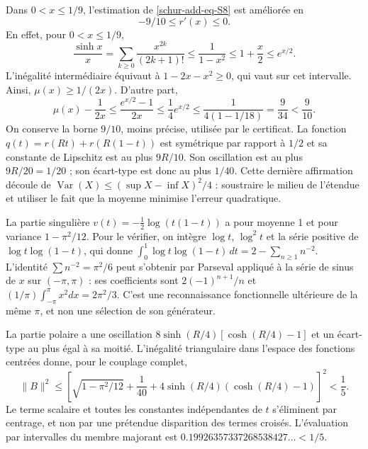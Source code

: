 Dans \(0<x\leq1/9\), l'estimation de \eqref{schur-add-eq-S8} est améliorée en
\begin{equation}
-9/10\leq r'(x)\leq0.
\label{schur-add-display-25}
\end{equation}
En effet, pour \(0<x\leq1/9\),
\begin{equation}
\frac{\sinh x}{x}
=\sum_{k\geq0}\frac{x^{2k}}{(2k+1)!}
\leq\frac1{1-x^2}\leq1+\frac x2\leq e^{x/2}.
\label{schur-add-display-26}
\end{equation}
L'inégalité intermédiaire équivaut à \(1-2x-x^2\geq0\),
qui vaut sur cet intervalle. Ainsi, \(\mu(x)\geq1/(2x)\).
D'autre part,
\begin{equation}
\mu(x)-\frac1{2x}\leq\frac{e^{x/2}-1}{2x}
\leq\frac14 e^{x/2}
\leq\frac1{4(1-1/18)}=\frac9{34}<\frac9{10}.
\label{schur-add-display-27}
\end{equation}
On conserve la borne \(9/10\), moins précise, utilisée par le certificat.
La fonction \(q(t)=r(Rt)+r(R(1-t))\) est symétrique par rapport à
\(1/2\) et sa constante de Lipschitz est au plus \(9R/10\).
Son oscillation est au plus \(9R/20=1/20\) ; son écart-type
est donc au plus \(1/40\). Cette dernière affirmation découle de
\(\operatorname{Var}(X)\leq(\sup X-\inf X)^2/4\) : soustraire le
milieu de l'étendue et utiliser le fait que la moyenne minimise l'erreur quadratique.

La partie singulière \(v(t)=-\tfrac12\log(t(1-t))\) a pour moyenne 1 et pour variance \(1-\pi^2/12\). Pour le vérifier, on intègre \(\log t\), \(\log^2t\) et la série positive de \(\log t\log(1-t)\), qui donne \(\int_0^1\log t\log(1-t)\,dt=2-\sum_{n\geq1}n^{-2}\). L'identité \(\sum n^{-2}=\pi^2/6\) peut s'obtenir par Parseval appliqué à la série de sinus de \(x\) sur \((-\pi,\pi)\) : ses coefficients sont \(2(-1)^{n+1}/n\) et \((1/\pi)\int_{-\pi}^{\pi}x^2dx=2\pi^2/3\). C'est une reconnaissance fonctionnelle ultérieure de la même \(\pi\), et non une sélection de son générateur.

La partie polaire a une oscillation
\(8\sinh(R/4)[\cosh(R/4)-1]\) et un écart-type au plus égal à
sa moitié. L'inégalité triangulaire dans l'espace des fonctions
centrées donne, pour le couplage complet,
\begin{equation}
\boxed{\|B\|^2\leq
\left[\sqrt{1-\pi^2/12}+\frac1{40}
+4\sinh(R/4)(\cosh(R/4)-1)\right]^2<\frac15.}
\label{schur-add-eq-S12}
\end{equation}
Le terme scalaire et toutes les constantes indépendantes de \(t\)
s'éliminent par centrage, et non par une prétendue disparition des
termes croisés. L'évaluation par intervalles du membre majorant est
\(0.19926357337268538427\ldots<1/5\).

